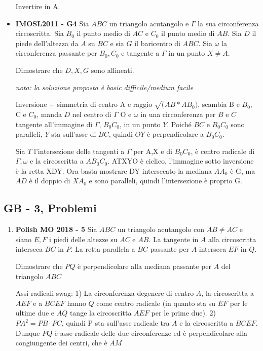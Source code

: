 \begin{itemize}
    \begin{sol}
    Invertire in A.
    \end{sol}

    
    
	\item \textbf{IMOSL2011 - G4} Sia $ABC$ un triangolo acutangolo e $\Gamma$ la sua circonferenza circoscritta. Sia $B_0$ il punto medio di $AC$ e $C_0$ il punto medio di $AB$. Sia $D$ il piede dell'altezza da $A$ su $BC$ e sia $G$ il baricentro di $ABC$. Sia $\omega$ la circonferenza passante per $B_0,C_0$ e tangente a $\Gamma$ in un punto $X\neq A$. 
	
	Dimostrare che $D,X,G$ sono allineati.
	
	\begin{sol}
	\emph{nota: la soluzione proposta è basic difficile/medium facile}
	
	Inversione + simmetria di centro A e raggio $\sqrt(AB*AB_0)$, scambia B e $B_0$, C e $C_0$, manda $D$ nel centro di $\Gamma$ O e $\omega$ in una circonferenza per $B$ e $C$ tangente all'immagine di $\Gamma$, $B_0C_0$, in un punto $Y$. Poiché $BC$ e $B_0C_0$ sono paralleli, $Y$ sta sull'asse di $BC$, quindi $OY$ è perpendicolare a $B_0C_0$. 
	
	Sia $T$ l'intersezione delle tangenti a $\Gamma$ per A,X e di $B_0C_0$, è centro radicale di $\Gamma, \omega$ e la circoscritta a $AB_0C_0$. ATXYO è ciclico, l'immagine sotto inversione è la retta XDY. Ora basta mostrare DY intersecato la mediana $AA_0$ è G, ma $AD$ è il doppio di $XA_0$ e sono paralleli, quindi l'intersezione è proprio G.
	\end{sol}
	


	\end{itemize}
	
	
\subsection{GB - 3, Problemi}
\begin{enumerate}
    \item \textbf{Polish MO 2018 - 5} Sia $ABC$ un triangolo acutangolo con $AB\neq AC$
    e siano $E,F$ i piedi delle altezze su $AC$ e $AB$. La tangente in $A$ alla circoscritta interseca $BC$ in $P$. La retta parallela a $BC$ passante per $A$ interseca $EF$ in $Q$. 
    
    Dimostrare che $PQ$ è perpendicolare alla mediana passante per $A$ del triangolo $ABC$
    
    \begin{sol}Assi radicali swag: 1) La circonferenza degenere di centro $A$, la circoscritta a $AEF$ e a $BCEF$ hanno $Q$ come centro radicale (in quanto sta su $EF$ per le ultime due e $AQ$ tange la circoscritta $AEF$ per le prime due). 2) $PA^2=PB\cdot PC$, quindi P sta sull'asse radicale tra $A$ e la circoscritta a $BCEF$. Dunque $PQ$ è asse radicale delle due circonferenze ed è perpendicolare alla congiungente dei centri, che è $AM$
    \end{sol}

\end{enumerate}


